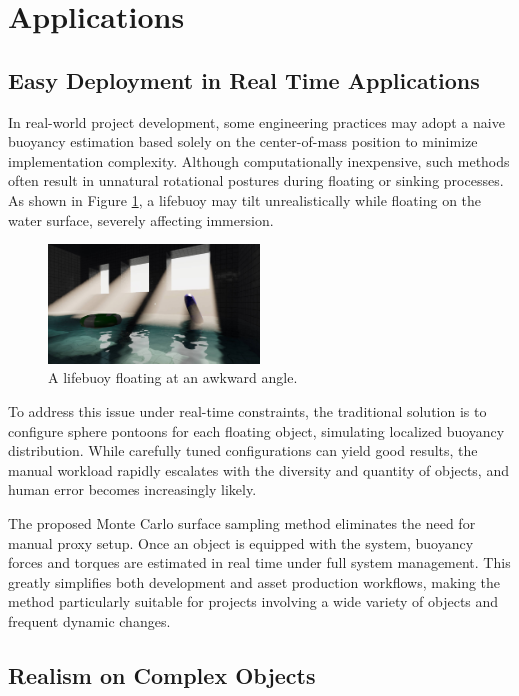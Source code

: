\section{Applications}

\subsection{Easy Deployment in Real Time Applications}

In real-world project development, some engineering practices may adopt a naive buoyancy estimation based solely on the center-of-mass position to minimize implementation complexity. Although computationally inexpensive, such methods often result in unnatural rotational postures during floating or sinking processes. As shown in Figure \ref{fig:bad-donut}, a lifebuoy may tilt unrealistically while floating on the water surface, severely affecting immersion.

\begin{figure}[H]
	\centering
	\includegraphics[width=0.5\textwidth]{./figures/bad-donut.jpg}
	\caption{A lifebuoy floating at an awkward angle.}
	\label{fig:bad-donut}
\end{figure}

To address this issue under real-time constraints, the traditional solution is to configure sphere pontoons for each floating object, simulating localized buoyancy distribution. While carefully tuned configurations can yield good results, the manual workload rapidly escalates with the diversity and quantity of objects, and human error becomes increasingly likely.

The proposed Monte Carlo surface sampling method eliminates the need for manual proxy setup. Once an object is equipped with the system, buoyancy forces and torques are estimated in real time under full system management. This greatly simplifies both development and asset production workflows, making the method particularly suitable for projects involving a wide variety of objects and frequent dynamic changes.

\subsection{Realism on Complex Objects}

